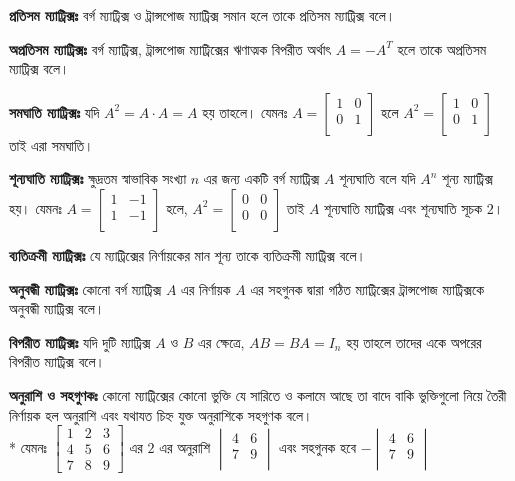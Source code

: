 \documentclass[a4paper,12pt]{article}
\begin{document}
\textbf{প্রতিসম ম্যাট্রিক্সঃ} বর্গ ম্যাট্রিক্স ও ট্রান্সপোজ ম্যাট্রিক্স সমান হলে তাকে প্রতিসম ম্যাট্রিক্স বলে। 

\textbf{অপ্রতিসম ম্যাট্রিক্সঃ} বর্গ ম্যাট্রিক্স, ট্রান্সপোজ ম্যাট্রিক্সের ঋণাত্মক বিপরীত অর্থাৎ $A=-A^T$ হলে তাকে অপ্রতিসম ম্যাট্রিক্স বলে।

\textbf{সমঘাতি ম্যাট্রিক্সঃ} যদি $A^2=A\cdot A= A$ হয় তাহলে। যেমনঃ $A= \begin{bmatrix}
    1 & 0 \\
    0 & 1 \\
    \end{bmatrix}$ হলে $A^2 = \begin{bmatrix}
        1 & 0 \\
        0 & 1 \\
        \end{bmatrix}$ তাই এরা সমঘাতি। 

\textbf{শূন্যঘাতি ম্যাট্রিক্সঃ} ক্ষুদ্রতম স্বাভাবিক সংখ্যা $n$ এর জন্য একটি বর্গ ম্যাট্রিক্স $A$ শূন্যঘাতি বলে যদি $A^n$ শূন্য ম্যাট্রিক্স হয়। যেমনঃ $A=\begin{bmatrix}
    1 & -1 \\
    1 & -1 \\
    \end{bmatrix}$
    হলে, $A^2 = \begin{bmatrix}
        0 & 0 \\
        0 & 0 \\
        \end{bmatrix}$ তাই $A$ শূন্যঘাতি ম্যাট্রিক্স এবং শূন্যঘাতি সূচক $2$। 
    
\textbf{ব্যতিক্রমী ম্যাট্রিক্সঃ} যে ম্যাট্রিক্সের নির্ণায়কের মান শূন্য তাকে ব্যতিক্রমী ম্যাট্রিক্স বলে। 

\textbf{অনুবন্ধী ম্যাট্রিক্সঃ} কোনো বর্গ ম্যাট্রিক্স $A$ এর নির্ণায়ক $A$ এর সহগুনক দ্বারা গঠিত ম্যাট্রিক্সের ট্রান্সপোজ ম্যাট্রিক্সকে অনুবন্ধী ম্যাট্রিক্স বলে। 

\textbf{বিপরীত ম্যাট্রিক্সঃ} যদি দুটি ম্যাট্রিক্স $A$ ও $B$ এর ক্ষেত্রে, $AB=BA=I_n$ হয় তাহলে তাদের একে অপরের বিপরীত ম্যাট্রিক্স বলে।

\textbf{অনুরাশি ও সহগুণকঃ} কোনো ম্যাট্রিক্সের কোনো ভুক্তি যে সারিতে ও কলামে আছে তা বাদে বাকি ভুক্তিগুলো নিয়ে তৈরী নির্ণায়ক হল অনুরাশি এবং যথাযত চিহ্ন যুক্ত অনুরাশিকে সহগুণক বলে।\\*
যেমনঃ $\begin{bmatrix}
    1 & 2 & 3\\
    4 & 5 & 6\\
    7 & 8 & 9
    \end{bmatrix}$ এর $2$ এর অনুরাশি $\begin{vmatrix}
        4 & 6\\
        7 & 9\\
        \end{vmatrix}$ এবং সহগুনক হবে $-\begin{vmatrix}
            4 & 6\\
            7 & 9\\
            \end{vmatrix}$
\end{document}
